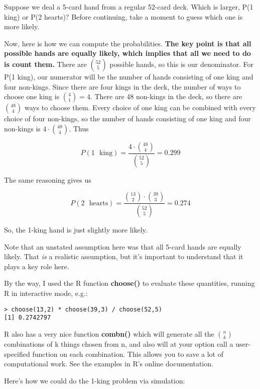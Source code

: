 Suppose we deal a 5-card hand from a regular 52-card deck.  Which is
larger, P(1 king) or P(2 hearts)?  Before continuing, take a moment to
guess which one is more likely.

Now, here is how we can compute the probabilities.  {\bf The key point is
that all possible hands are equally likely, which implies that all we
need to do is count them.}  There are $\binom{52}{5}$ possible hands, so
this is our denominator.  For P(1 king), our numerator will be the
number of hands consisting of one king and four non-kings.  Since there
are four kings in the deck, the number of ways to choose one king is
$\binom{4}{1} = 4$.  There are 48 non-kings in the deck, so there are
$\binom{48}{4}$ ways to choose them.  Every choice of one king can be
combined with every choice of four non-kings, so the number of hands
consisting of one king and four non-kings is $4 \cdot \binom{48}{4}$.
Thus

\begin{equation}
P(1 \textrm{~ king}) = \frac{4 \cdot \binom{48}{4}}{\binom{52}{5}} = 0.299
\end{equation}

The same reasoning gives us

\begin{equation}
P(2 \textrm{~ hearts}) = \frac{\binom{13}{2} \cdot \binom{39}{3}}{\binom{52}{5}} = 0.274
\end{equation}

So, the 1-king hand is just slightly more likely.

Note that an unstated assumption here was that all 5-card hands are
equally likely.  That {\it is} a realistic assumption, but it's
important to understand that it plays a key role here.

By the way, I used the R function {\bf choose()} to evaluate these
quantities, running R in interactive mode, e.g.:

\begin{Verbatim}[fontsize=\relsize{-2}]
> choose(13,2) * choose(39,3) / choose(52,5)
[1] 0.2742797
\end{Verbatim}

R also has a very nice function {\bf combn()} which will generate all
the $\binom{n}{k}$ combinations of k things chosen from n, and also will
at your option call a user-specified function on each combination.  This
allows you to save a lot of computational work.  See the examples in R's
online documentation.

Here's how we could do the 1-king problem via simulation:

